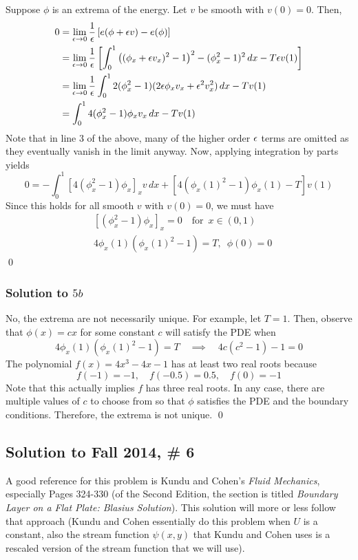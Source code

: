 Suppose $\phi$ is an extrema of the energy. Let $v$ be smooth with $v(0) = 0$. Then,
\begin{align*}
0 &= \lim_{\epsilon \to 0} \dfrac{1}{\epsilon} \left[ e(\phi + \epsilon v) - e(\phi) \right] \\
&= \lim_{\epsilon \to 0} \dfrac{1}{\epsilon} \left[ \int_0^1 \left( (\phi_x + \epsilon v_x)^2 - 1\right)^2 - (\phi_x^2 - 1)^2 \, dx - T\epsilon v(1) \right] \\
&= \lim_{\epsilon \to 0} \dfrac{1}{\epsilon} \int_0^1 2(\phi_x^2-1)(2 \epsilon \phi_x v_x + \epsilon^2 v_x^2) \, dx - Tv(1) \\
&= \int_0^1 4 (\phi_x^2 - 1) \phi_x v_x \, dx - T v(1)
\end{align*}
Note that in line 3 of the above, many of the higher order $\epsilon$ terms are omitted as they eventually vanish in the limit anyway. Now, applying integration by parts yields
$$ 0 = -\int_0^1 \left[ 4(\phi_x^2 - 1) \phi_x\right]_x v \, dx + \left[4 (\phi_x(1)^2 - 1)\phi_x(1) - T \right] v(1) $$
Since this holds for all smooth $v$ with $v(0) = 0$, we must have
\begin{align*}
&\left[ (\phi_x^2-1) \phi_x \right]_x = 0 \quad \text{for} \,\,\, x \in (0,1) \\
&4 \phi_x(1) (\phi_x(1)^2-1) = T, \,\,\, \phi(0) = 0
\end{align*} \hfill \qed

\subsubsection*{Solution to $5b$}

No, the extrema are not necessarily unique. For example, let $T=1$. Then, observe that $\phi(x) = cx$ for some constant $c$ will satisfy the PDE when
$$ 4 \phi_x(1) (\phi_x(1)^2-1) = T \quad \implies \quad 4 c(c^2-1) - 1 = 0 $$
The polynomial $f(x) = 4x^3 - 4x - 1$ has at least two real roots because
$$f(-1) = -1, \quad f(-0.5) = 0.5, \quad f(0) = -1 $$
Note that this actually implies $f$ has three real roots. In any case, there are multiple values of $c$ to choose from so that $\phi$ satisfies the PDE and the boundary conditions. Therefore, the extrema is not unique. \hfill \qed






\subsection*{Solution to Fall 2014, \# 6}
\label{F14Q6}

A good reference for this problem is Kundu and Cohen's \emph{Fluid Mechanics}, especially Pages 324-330 (of the Second Edition, the section is titled
\emph{Boundary Layer on a Flat Plate: Blasius Solution}). This solution will more or less follow that approach
(Kundu and Cohen essentially do this problem when $U$ is a constant, also the stream function $\psi(x, y)$ that Kundu and Cohen uses is a rescaled
version of the stream function that we will use).

